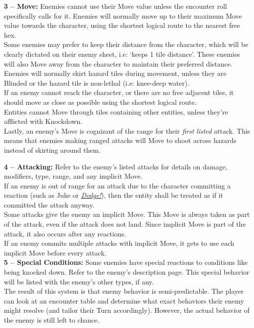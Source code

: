 \documentclass[12pt]{article}
\newcommand{\reftoit}[1]{\hyperlink{#1}{\emph{#1}}}
\begin{document}
\begin{multicols*}{2}
\textbf{3 -- Move:} Enemies cannot use their Move value unless the encounter roll specifically calls for it. Enemies will normally move up to their maximum Move value towards the character, using the shortest logical route to the nearest free hex.\\
Some enemies may prefer to keep their distance from the character, which will be clearly dictated on their enemy sheet, i.e: ‘keeps 1 tile distance’. These enemies will also Move away from the character to maintain their preferred distance.\\
Enemies will normally skirt hazard tiles during movement, unless they are Blinded or the hazard tile is non-lethal (i.e: knee-deep water).\\
If an enemy cannot reach the character, or there are no free adjacent tiles, it should move as close as possible using the shortest logical route.\\ 
Entities cannot Move through tiles containing other entities, unless they’re afflicted with Knockdown.\\
Lastly, an enemy’s Move is cognizant of the range for their \emph{first listed} attack. This means that enemies making ranged attacks will Move to shoot across hazards instead of skirting around them.

\textbf{4 -- Attacking:} Refer to the enemy’s listed attacks for details on damage, modifiers, type, range, and any implicit Move.\\
If an enemy is out of range for an attack due to the character committing a reaction (such as Juke or \reftoit{Dodge!}), then the entity shall be treated as if it committed the attack anyway.\\
Some attacks give the enemy an implicit Move. This Move is always taken as part of the attack, even if the attack does not land. Since implicit Move is part of the attack, it also occurs after any reactions.\\
If an enemy commits multiple attacks with implicit Move, it gets to use each implicit Move before every attack.\\

\textbf{5 -- Special Conditions:} Some enemies have special reactions to conditions like being knocked down. Refer to the enemy’s description page. This special behavior will be listed with the enemy’s other types, if any.\\

The result of this system is that enemy behavior is semi-predictable. The player can look at an encounter table and determine what exact behaviors their enemy might resolve (and tailor their Turn accordingly). However, the actual behavior of the enemy is still left to chance.


\end{multicols*}
\end{document}
